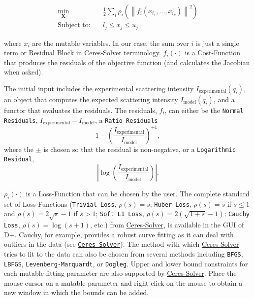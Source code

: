 \documentclass[../D+Manual.tex]{subfiles}
\begin{document}
\begin{equation*}
\begin{split}\min_{\mathbf{X}} &\quad \frac{1}{2}\sum_{i} \rho_i\left(\left\|f_i\left(x_{i_1}, ... ,x_{i_k}\right)\right\|^2\right) \\
\text{Subject to:} &\quad l_j \le x_j \le u_j\end{split}
\end{equation*}

\noindent where $x_i$ are the mutable variables.
In our case, the sum over $i$ is just a single term or Residual Block in \href{http://ceres-solver.org/}{Ceres-Solver} terminology.
$f_i(\cdot)$ is a Cost-Function that produces the residuals of the objective function (and calculates the Jacobian when asked).

The initial input includes the experimental scattering intensity  $I_\text{experimental}\left(q_i\right)$, an object that computes the expected scattering intensity  $I_\text{model}\left(q_i\right)$, and a functor that evaluates the residuals.
The residuals, $f_i$, can either be the \texttt{Normal Residuals}, $I_\text{experimental} - I_\text{model}$,
a \texttt{Ratio Residuals}
\begin{equation*}
1-\left(\frac{I_\text{experimental}}{I_\text{model}}\right)^{\pm 1},
\end{equation*}
where the $\pm$ is chosen so that the residual is non-negative, or a \texttt{Logarithmic Residual},
\begin{equation*}
\left|\log\left(\frac{I_\text{experimental}}{I_\text{model}}\right)\right|.
\end{equation*}
 
$\rho_i\left(\cdot\right)$ is a Loss-Function that can be chosen by the user.
The complete standard set of Loss-Functions (\texttt{Trivial Loss}, $\rho(s)=s$; \texttt{Huber Loss}, $\rho(s)=s$ if $s \le 1$ and $\rho(s)=2\sqrt{s}-1$ if $s>1$; \texttt{Soft L1 Loss}, $\rho(s)=2\left(\sqrt{1+s}-1\right)$;  \texttt{Cauchy Loss}, $\rho(s)=\log \left(s+1\right)$, etc.) from \href{http://ceres-solver.org/}{Ceres-Solver}, is available in the GUI of D+. Cauchy, for example, provides a robust curve fitting as it can deal with outliers in the data (see \href{http://ceres-solver.org/nnls_modeling.html}{\texttt{Ceres-Solver}}).
The method with which \href{http://ceres-solver.org/nnls_solving.html}{Ceres-Solver} tries to fit to the data can also be chosen from several methods including \texttt{BFGS}, \texttt{LBFGS}, \texttt{Levenberg-Marquardt}, or \texttt{Dogleg}. 
Upper and lower bound constraints for each mutable fitting parameter are also supported by  \href{http://ceres-solver.org/nnls_solving.html}{Ceres-Solver}. Place the mouse cursor on a mutable parameter and right click on the mouse to obtain a new window in which the bounds can be added. 
\end{document}
